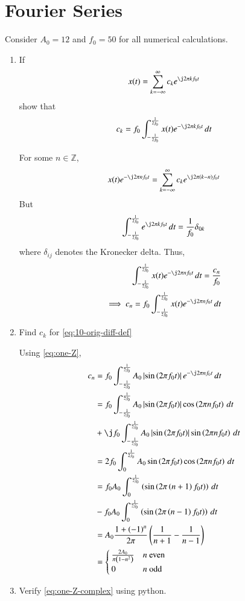 \documentclass[journal,12pt,twocolumn]{IEEEtran}
\renewcommand\thesection{\arabic{section}}
\begin{document}
\section{Fourier Series}
Consider $A_0 =12$ and $f_0 = 50$ for all numerical calculations.
\begin{enumerate}[label=\thesection.\arabic*,ref=\thesection.\theenumi]
\item If
\begin{align}
	x(t) = \sum_{k = -\infty}^{\infty}c_ke^{\j2\pi kf_0 t}
\label{eq:one-Z-complex}
\end{align}
show that 
\begin{align}
	c_k = f_0\int_{-\frac{1}{2f_0}}^{\frac{1}{2f_0}}x(t)e^{-\j2\pi kf_0 t}\, dt
\label{eq:one-Z}
\end{align}

\solution For some $n \in \mathbb{Z}$,
\begin{align}
    x(t)e^{-\j2\pi nf_0t} = \sum_{k = -\infty}^{\infty}c_ke^{\j2\pi (k - n)f_0 t}
\end{align}
But
\begin{align}
    \int_{-\frac{1}{2f_0}}^{\frac{1}{2f_0}}e^{\j2\pi kf_0 t}\, dt = 
    \frac{1}{f_0}\delta_{0k}
\end{align}
where $\delta_{ij}$ denotes the Kronecker delta. Thus,
\begin{align}
    \int_{-\frac{1}{2f_0}}^{\frac{1}{2f_0}}x(t)e^{-\j2\pi nf_0 t}\, dt = 
    \frac{c_n}{f_0} \\
    \implies c_n = f_0\int_{-\frac{1}{2f_0}}^{\frac{1}{2f_0}}x(t)e^{-\j2\pi nf_0 t}\, dt 
\end{align}
\item Find $c_k$ for \eqref{eq:10-orig-diff-def}

\solution Using \eqref{eq:one-Z},
\begin{align}
    c_n &= f_0\int_{-\frac{1}{2f_0}}^{\frac{1}{2f_0}}A_0\abs{\sin\brak{2\pi f_0t}}
    e^{-\j2\pi nf_0t}\, dt \\
        &= f_0\int_{-\frac{1}{2f_0}}^{\frac{1}{2f_0}}A_0\abs{\sin\brak{2\pi f_0t}}
    \cos\brak{2\pi nf_0t}\, dt \nonumber \\
        &+ \j f_0\int_{-\frac{1}{2f_0}}^{\frac{1}{2f_0}}A_0
        \abs{\sin\brak{2\pi f_0t}}\sin\brak{2\pi nf_0t}\, dt \\
        &= 2f_0\int_{0}^{\frac{1}{2f_0}}A_0\sin\brak{2\pi f_0t}\cos\brak{2\pi nf_0t}\, dt \\
        &= f_0A_0\int_{0}^{\frac{1}{2f_0}}\brak{\sin\brak{2\pi\brak{n+1}f_0t}}\, dt \nonumber \\ 
        &- f_0A_0\int_{0}^{\frac{1}{2f_0}}\brak{\sin\brak{2\pi\brak{n-1}f_0t}}\, dt \\ 
        &= A_0\frac{1+\brak{-1}^n}{2\pi}\brak{\frac{1}{n+1} - \frac{1}{n-1}} \\
        &= 
        \begin{cases}
            \frac{2A_0}{\pi\brak{1-n^2}} & n\ \text{even} \\
            0 & n\ \text{odd}
        \end{cases}
        \label{eq:ck-xt}
\end{align}
\item Verify \eqref{eq:one-Z-complex} using python.


\end{enumerate}
\end{document}
